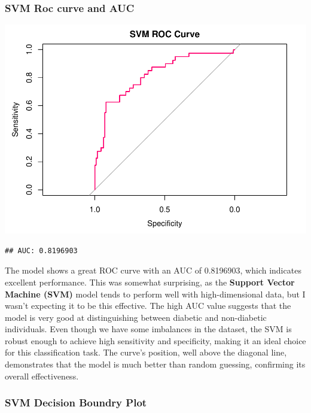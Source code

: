 \documentclass[
]{article}
\begin{document}
\subsubsection{SVM Roc curve and AUC}\label{svm-roc-curve-and-auc}

\begin{center}\includegraphics{Diabetes-Project_files/figure-latex/svm roc and auc-1} \end{center}

\begin{verbatim}
## AUC: 0.8196903
\end{verbatim}

The model shows a great ROC curve with an AUC of 0.8196903, which
indicates excellent performance. This was somewhat surprising, as the
\textbf{Support Vector Machine (SVM)} model tends to perform well with
high-dimensional data, but I wasn't expecting it to be this effective.
The high AUC value suggests that the model is very good at
distinguishing between diabetic and non-diabetic individuals. Even
though we have some imbalances in the dataset, the SVM is robust enough
to achieve high sensitivity and specificity, making it an ideal choice
for this classification task. The curve's position, well above the
diagonal line, demonstrates that the model is much better than random
guessing, confirming its overall effectiveness.

\newpage

\subsubsection{SVM Decision Boundry
Plot}\label{svm-decision-boundry-plot}
\end{document}
